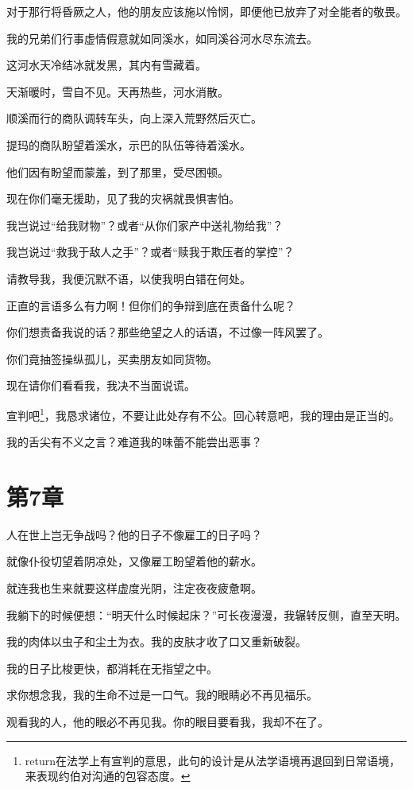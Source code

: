 \documentclass[12pt,oneside]{book}
\begin{document}
对于那行将昏厥之人，他的朋友应该施以怜悯，即便他已放弃了对全能者的敬畏。

我的兄弟们行事虚情假意就如同溪水，如同溪谷河水尽东流去。

这河水天冷结冰就发黑，其内有雪藏着。

天渐暖时，雪自不见。天再热些，河水消散。

顺溪而行的商队调转车头，向上深入荒野然后灭亡。

提玛的商队盼望着溪水，示巴的队伍等待着溪水。

他们因有盼望而蒙羞，到了那里，受尽困顿。

现在你们毫无援助，见了我的灾祸就畏惧害怕。

我岂说过“给我财物”？或者“从你们家产中送礼物给我”？

我岂说过“救我于敌人之手”？或者“赎我于欺压者的掌控”？

请教导我，我便沉默不语，以使我明白错在何处。

正直的言语多么有力啊！但你们的争辩到底在责备什么呢？

你们想责备我说的话？那些绝望之人的话语，不过像一阵风罢了。

你们竟抽签操纵孤儿，买卖朋友如同货物。

现在请你们看看我，我决不当面说谎。

宣判吧\footnote{return在法学上有宣判的意思，此句的设计是从法学语境再退回到日常语境，来表现约伯对沟通的包容态度。}，我恳求诸位，不要让此处存有不公。回心转意吧，我的理由是正当的。

我的舌尖有不义之言？难道我的味蕾不能尝出恶事？



\chapter{第7章}
人在世上岂无争战吗？他的日子不像雇工的日子吗？

就像仆役切望着阴凉处，又像雇工盼望着他的薪水。

就连我也生来就要这样虚度光阴，注定夜夜疲惫啊。

我躺下的时候便想：“明天什么时候起床？”可长夜漫漫，我辗转反侧，直至天明。

我的肉体以虫子和尘土为衣。我的皮肤才收了口又重新破裂。

我的日子比梭更快，都消耗在无指望之中。

求你想念我，我的生命不过是一口气。我的眼睛必不再见福乐。

观看我的人，他的眼必不再见我。你的眼目要看我，我却不在了。
\end{document}
